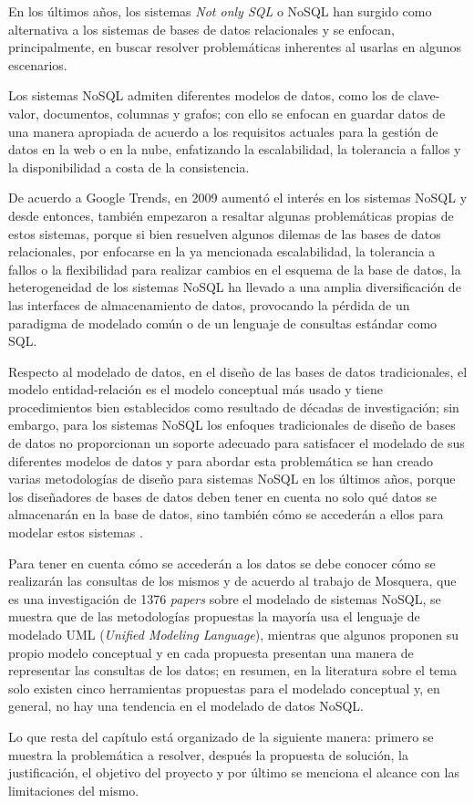 En los últimos años, los sistemas \textit{Not only SQL} o NoSQL han surgido como alternativa a los sistemas de bases de datos relacionales y se enfocan, principalmente, en buscar resolver problemáticas inherentes al usarlas en algunos escenarios.


Los sistemas NoSQL admiten diferentes modelos de datos, como los de clave-valor, documentos, columnas y grafos; con ello se enfocan en guardar datos de una manera apropiada de acuerdo a los requisitos actuales para la gestión de datos en la web o en la nube, enfatizando la escalabilidad, la tolerancia a fallos y la disponibilidad a costa de la consistencia.


De acuerdo a Google Trends\cite{google_google_2020}, en 2009 aumentó el interés en los sistemas NoSQL y desde entonces, también empezaron a resaltar algunas problemáticas propias de estos sistemas, porque si bien resuelven algunos dilemas de las bases de datos relacionales, por enfocarse en la ya mencionada escalabilidad, la tolerancia a fallos o la flexibilidad para realizar cambios en el esquema de la base de datos, la heterogeneidad de los sistemas NoSQL ha llevado a una amplia diversificación de las interfaces de almacenamiento de datos, provocando la pérdida de un paradigma de modelado común o de un lenguaje de consultas estándar como SQL.


Respecto al modelado de datos, en el diseño de las bases de datos tradicionales, el modelo entidad-relación\cite{codd_relational_nodate} es el modelo conceptual más usado y tiene procedimientos bien establecidos como resultado de décadas de investigación; sin embargo, para los sistemas NoSQL los enfoques tradicionales de diseño de bases de datos no proporcionan un soporte adecuado para satisfacer el modelado de sus diferentes modelos de datos y para abordar esta problemática se han creado varias metodologías de diseño para sistemas NoSQL en los últimos años, porque los diseñadores de bases de datos deben tener en cuenta no solo qué datos se almacenarán en la base de datos, sino también cómo se accederán a ellos para modelar estos sistemas \cite{li_transforming_2010,chebotko_big_2015,mior_nose_2017}. 


Para tener en cuenta cómo se accederán a los datos se debe conocer cómo se realizarán las consultas de los mismos y de acuerdo al trabajo de Mosquera\cite{martinez-mosquera_modeling_2020}, que es una investigación de 1376 \textit{papers} sobre el modelado de sistemas NoSQL, se muestra que de las metodologías propuestas la mayoría usa el lenguaje de modelado UML (\textit{Unified Modeling Language}), mientras que algunos proponen su propio modelo conceptual  y en cada propuesta presentan una manera de representar las consultas de los datos; en resumen, en la literatura sobre el tema solo existen cinco herramientas propuestas para el modelado conceptual y, en general, no hay una tendencia en el modelado de datos NoSQL.


Lo que resta del capítulo está organizado de la siguiente manera: primero se muestra la problemática a resolver, después la propuesta de solución, la justificación, el objetivo del proyecto y por último se menciona el alcance con las limitaciones del mismo.
